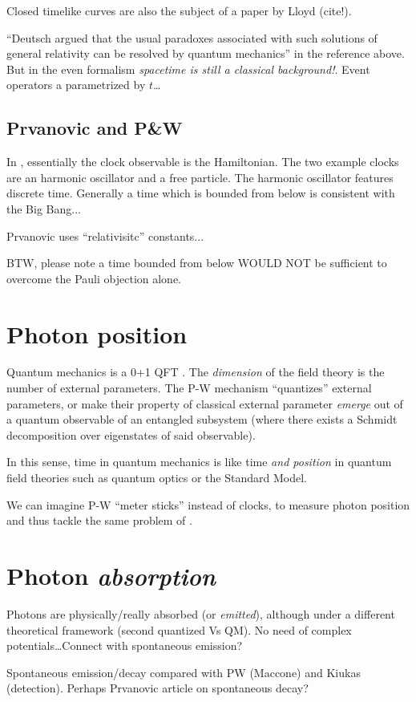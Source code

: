 Closed timelike curves are also the subject of a paper by Lloyd (cite!).

``Deutsch argued that
the usual paradoxes associated with such solutions of general
relativity can be resolved by quantum mechanics''  in the reference above. But in the even formalism
\emph{spacetime is still a classical background!}. Event operators a parametrized by $t$\dots

\subsection{Prvanovic and P\&W}
In \cite{Prvanovic}, essentially the clock observable is the Hamiltonian.
The two example clocks are an harmonic oscillator and a free particle.
The harmonic oscillator features discrete time. Generally a time which is
{bounded from below}
is consistent with the Big Bang...

Prvanovic uses ``relativisitc'' constants...

BTW, please note a time bounded from below WOULD NOT be sufficient to overcome the Pauli objection alone.

\section{Photon position}

Quantum mechanics is a 0+1 QFT \parencite{QFT_0+1}.
The \emph{dimension} of the field theory is the number of external parameters.
The P-W mechanism ``quantizes'' external parameters, or make their property
of classical external parameter \emph{emerge} out of a quantum observable
of an entangled subsystem (where there exists a Schmidt decomposition over
eigenstates of said observable).

In this sense, time in quantum mechanics is like time \emph{and position}
in quantum field theories such as quantum optics or the Standard Model.

We can imagine P-W ``meter sticks'' instead of clocks, to measure
photon position and thus tackle the same problem of \cite{HawtonPhotonPosition}.

\section{Photon \emph{absorption}}

Photons are physically/really absorbed (or \emph{emitted}), although under a different theoretical framework
(second quantized Vs QM). No need of complex potentials\dots Connect with spontaneous emission?

Spontaneous emission/decay compared with PW (Maccone) and Kiukas (detection).
Perhaps Prvanovic article on spontaneous decay?
